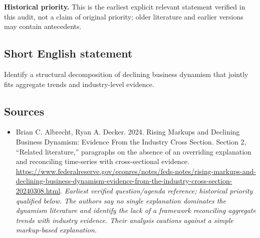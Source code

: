 \documentclass[11pt]{article}
\begin{document}
\par\textbf{Historical priority.} This is the earliest explicit relevant statement verified in this audit, not a claim of original priority; older literature and earlier versions may contain antecedents.

\subsection{Short English statement}
Identify a structural decomposition of declining business dynamism that jointly fits aggregate trends and industry-level evidence.

\subsection{Sources}
\begin{itemize}\raggedright
\item[\textnormal{[S1]}]\hypertarget{source:30007546:1}{} Brian C. Albrecht, Ryan A. Decker. 2024. Rising Markups and Declining Business Dynamism: Evidence From the Industry Cross Section. Section 2, “Related literature,” paragraphs on the absence of an overriding explanation and reconciling time-series with cross-sectional evidence.
\url{https://www.federalreserve.gov/econres/notes/feds-notes/rising-markups-and-declining-business-dynamism-evidence-from-the-industry-cross-section-20240308.html}.
{\small\textit{Earliest verified question/agenda reference; historical priority qualified below. The authors say no single explanation dominates the dynamism literature and identify the lack of a framework reconciling aggregate trends with industry evidence. Their analysis cautions against a simple markup-based explanation.}}
\end{itemize}
\end{document}
